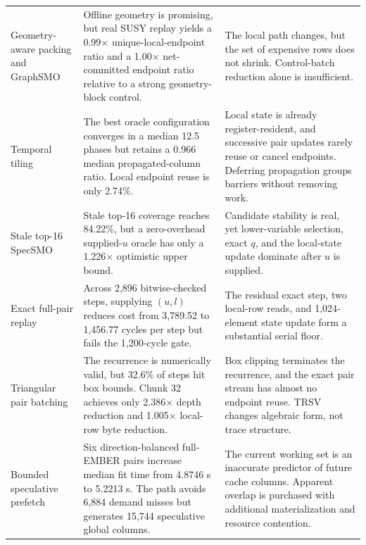 \begin{longtable}{@{}L{0.21\textwidth}L{0.36\textwidth}L{0.35\textwidth}@{}}
  Geometry-aware packing and GraphSMO &
  Offline geometry is promising, but real SUSY replay yields a
  0.99$\times$ unique-local-endpoint ratio and a 1.00$\times$ net-committed
  endpoint ratio relative to a strong geometry-block control. &
  The local path changes, but the set of expensive rows does not shrink.
  Control-batch reduction alone is insufficient. \\

  Temporal tiling &
  The best oracle configuration converges in a median 12.5 phases but retains
  a 0.966 median propagated-column ratio. Local endpoint reuse is only 2.74\%. &
  Local state is already register-resident, and successive pair updates rarely
  reuse or cancel endpoints. Deferring propagation groups barriers without
  removing work. \\

  Stale top-16 SpecSMO &
  Stale top-16 coverage reaches 84.22\%, but a zero-overhead supplied-$u$
  oracle has only a 1.226$\times$ optimistic upper bound. &
  Candidate stability is real, yet lower-variable selection, exact $q$, and
  the local-state update dominate after $u$ is supplied. \\

  Exact full-pair replay &
  Across 2,896 bitwise-checked steps, supplying $(u,l)$ reduces cost from
  3,789.52 to 1,456.77 cycles per step but fails the 1,200-cycle gate. &
  The residual exact step, two local-row reads, and 1,024-element state update
  form a substantial serial floor. \\

  Triangular pair batching &
  The recurrence is numerically valid, but 32.6\% of steps hit box bounds.
  Chunk 32 achieves only 2.386$\times$ depth reduction and
  1.005$\times$ local-row byte reduction. &
  Box clipping terminates the recurrence, and the exact pair stream has almost
  no endpoint reuse. TRSV changes algebraic form, not trace structure. \\

  Bounded speculative prefetch &
  Six direction-balanced full-EMBER pairs increase median fit time from
  4.8746 s to 5.2213 s. The path avoids 6,884 demand misses but generates
  15,744 speculative global columns. &
  The current working set is an inaccurate predictor of future cache columns.
  Apparent overlap is purchased with additional materialization and resource
  contention. \\
\end{longtable}
\normalsize

